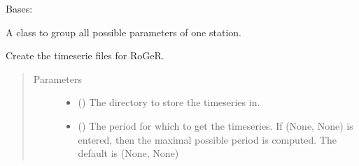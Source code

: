 \documentclass[letterpaper,10pt,english]{sphinxmanual}
\begin{document}
\begin{fulllineitems}
\label{\detokenize{weatherDB:weatherDB.station.GroupStation}}
\sphinxAtStartPar
Bases: 

\sphinxAtStartPar
A class to group all possible parameters of one station.

\begin{fulllineitems}
\label{\detokenize{weatherDB:weatherDB.station.GroupStation.__init__}}
\end{fulllineitems}


\begin{fulllineitems}
\label{\detokenize{weatherDB:weatherDB.station.GroupStation.create_roger_ts}}
\sphinxAtStartPar
Create the timeserie files for RoGeR.
\begin{quote}\begin{description}
\item[{Parameters}] \leavevmode\begin{itemize}
\item {} 
\sphinxAtStartPar
{} () \textendash{} The directory to store the timeseries in.

\item {} 
\sphinxAtStartPar
{} (\sphinxstyleliteralemphasis{\sphinxupquote{, }}) \textendash{} The period for which to get the timeseries.
If (None, None) is entered, then the maximal possible period is computed.
The default is (None, None)


\end{itemize}
\end{description}
\end{quote}
\end{fulllineitems}
\end{fulllineitems}
\end{document}
